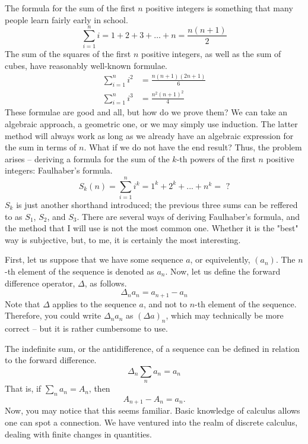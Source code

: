 \documentclass[12pt]{article}
\theoremstyle{definition}
\begin{document}
The formula for the sum of the first $n$ positive integers is something that many people learn fairly early in school.
\begin{equation*}
    \sum_{i=1}^{n} i = 1 + 2 + 3 + \ldots + n = \frac{n(n+1)}{2}
\end{equation*}
The sum of the squares of the first $n$ positive integers, as well as the sum of cubes, have reasonably well-known formulae.
\begin{align*}
    \sum_{i=1}^{n} i^2 & = \frac{n(n+1)(2n+1)}{6} \\
    \sum_{i=1}^{n} i^3 & = \frac{n^2 (n+1)^2}{4}
\end{align*}
These formulae are good and all, but how do we prove them?
We can take an algebraic approach, a geometric one, or we may simply use induction.
The latter method will always work as long as we already have an algebraic expression for the sum in terms of $n$.
What if we do not have the end result?
Thus, the problem arises -- deriving a formula for the sum of the $k$-th powers of the first $n$ positive integers: Faulhaber's formula.
\begin{equation*}
    S_k(n) = \sum_{i=1}^{n} i^k = 1^k + 2^k + ... + n^k = \text{ ?}
\end{equation*}
$S_k$ is just another shorthand introduced; the previous three sums can be reffered to as $S_1$, $S_2$, and $S_3$.
There are several ways of deriving Faulhaber's formula, and the method that I will use is not the most common one.
Whether it is the "best" way is subjective, but, to me, it is certainly the most interesting.

First, let us suppose that we have some sequence $a$, or equivelently, $(a_n)$.
The $n$-th element of the sequence is denoted as $a_n$.
Now, let us define the forward difference operator, $\Delta$, as follows.
\begin{equation}
    \Delta_n a_n = a_{n+1} - a_n
\end{equation}
Note that $\Delta$ applies to the sequence $a$, and not to $n$-th element of the sequence.
Therefore, you could write $\Delta_n a_n$ as $(\Delta a)_n$, which may technically be more correct -- but it is rather cumbersome to use.

The indefinite sum, or the antidifference, of a sequence can be defined in relation to the forward difference.
\begin{equation}
    \Delta_n \sum_n a_n = a_n
\end{equation}
That is, if $\sum_n a_n = A_n$, then
\begin{equation}
    A_{n+1} - A_n = a_n.
\end{equation}
Now, you may notice that this seems familiar.
Basic knowledge of calculus allows one can spot a connection.
We have ventured into the realm of discrete calculus, dealing with finite changes in quantities.
\end{document}
